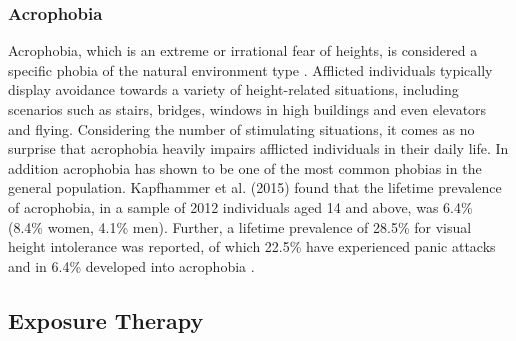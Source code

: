 \subsubsection{Acrophobia}
Acrophobia, which is an extreme or irrational fear of heights, is considered a specific phobia of the natural environment type \cite{DSMIV1994}. Afflicted individuals typically display avoidance towards a variety of height-related situations, including scenarios such as stairs, bridges, windows in high buildings and even elevators and flying. Considering the number of stimulating situations, it comes as no surprise that acrophobia heavily impairs afflicted individuals in their daily life. In addition acrophobia has shown to be one of the most common phobias in the general population. Kapfhammer et al. (2015) found that the lifetime prevalence of acrophobia, in a sample of 2012 individuals aged 14 and above, was 6.4\% (8.4\% women, 4.1\% men). Further, a lifetime prevalence of 28.5\% for visual height intolerance was reported, of which 22.5\% have experienced panic attacks and in 6.4\% developed into acrophobia \cite{Kapfhammer2015}. 





\subsection{Exposure Therapy}\label{EXPEP}

